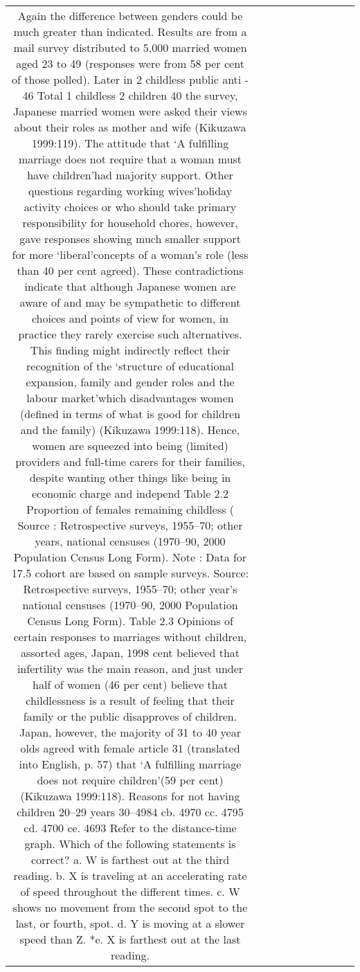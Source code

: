 \begin{table}[h!]
\begin{tabular}{|c|c|c|c|c|c|c|c|c|c|}
Again the difference between genders could be much greater than indicated. Results are from a mail survey distributed to 5,000 married women aged 23 to 49 (responses were from 58 per cent of those polled). Later in 2 childless public anti - 46%
Total 1 childless 2 children 40%
the survey, Japanese married women were asked their views about their roles as mother and wife (Kikuzawa 1999:119). The attitude that ‘A fulfilling marriage does not require that a woman must have children’had majority support. Other questions regarding working wives’holiday activity choices or who should take primary responsibility for household chores, however, gave responses showing much smaller support for more ‘liberal’concepts of a woman’s role (less than 40 per cent agreed). These contradictions indicate that although Japanese women are aware of and may be sympathetic to different choices and points of view for women, in practice they rarely exercise such alternatives.
This finding might indirectly reflect their recognition of the ‘structure of educational expansion, family and gender roles and the labour market’which disadvantages women (defined in terms of what is good for children and the family) (Kikuzawa 1999:118). Hence, women are squeezed into being (limited) providers and full-time carers for their families, despite wanting other things like being in economic charge and independ
Table 2.2 Proportion of females remaining childless (%
Source : Retrospective surveys, 1955–70; other years, national censuses (1970–90, 2000 Population Census Long Form). Note : Data for 17.5 cohort are based on sample surveys.
Source: Retrospective surveys, 1955–70; other year’s national censuses (1970–90, 2000 Population Census Long Form).
Table 2.3 Opinions of certain responses to marriages without children, assorted ages,
Japan, 1998
cent believed that infertility was the main reason, and just under half of women (46 per cent) believe that childlessness is a result of feeling that their family or the public disapproves of children.
Japan, however, the majority of 31 to 40 year olds agreed with female article 31 (translated into English, p. 57) that ‘A fulfilling marriage does not require children’(59 per cent) (Kikuzawa 1999:118).
Reasons for not having children 20–29 years 30–4984 cb. 4970 cc. 4795 cd. 4700 ce. 4693
Refer to the distance-time graph. Which of the following statements is correct? a. W is farthest out at the third reading. b. X is traveling at an accelerating rate of speed throughout the different times. c. W shows no movement from the second spot to the last, or fourth, spot. d. Y is moving at a slower speed than Z. *e. X is farthest out at the last reading.

\end{tabular}
\end{table}
